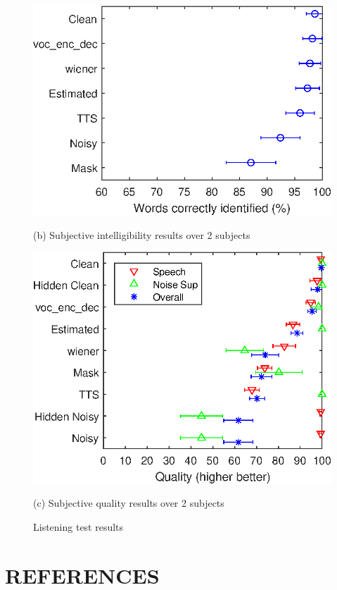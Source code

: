 \documentclass{article}
\begin{document}
\begin{figure}[htb]
\begin{minipage}[b]{1.0\linewidth}
  \centering
  \centerline{\includegraphics[width=.9\linewidth]{00-intel.eps}}
  \centerline{(b) Subjective intelligibility results over 2 subjects}\medskip
\end{minipage}
%
\begin{minipage}[b]{1.0\linewidth}
  \centering
  \centerline{\includegraphics[width=.92\textwidth]{01-qual.eps}}
  \centerline{(c) Subjective quality results over 2 subjects}\medskip
\end{minipage}
\caption{Listening test results}
\label{fig:res}
%
\end{figure}
\vfill\pagebreak



\section{REFERENCES}
\label{sec:refs}



\end{document}
